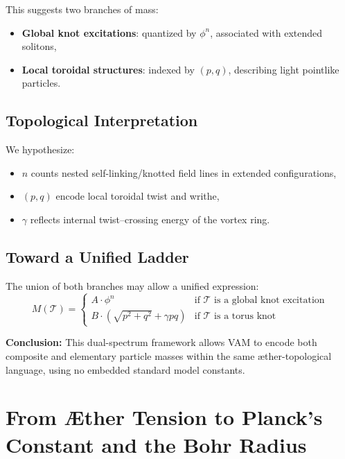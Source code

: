 \documentclass[a4paper,12pt]{article}
\begin{document}
        This suggests two branches of mass:
        \begin{itemize}
          \item \textbf{Global knot excitations}: quantized by $\phi^n$, associated with extended solitons,
          \item \textbf{Local toroidal structures}: indexed by $(p,q)$, describing light pointlike particles.
        \end{itemize}

        \subsection{Topological Interpretation}

        We hypothesize:
        \begin{itemize}
          \item $n$ counts nested self-linking/knotted field lines in extended configurations,
          \item $(p,q)$ encode local toroidal twist and writhe,
          \item $\gamma$ reflects internal twist–crossing energy of the vortex ring.
        \end{itemize}

        \subsection{Toward a Unified Ladder}

        The union of both branches may allow a unified expression:
        \[
        M(\mathcal{T}) =
        \begin{cases}
        A \cdot \phi^n & \text{if } \mathcal{T} \text{ is a global knot excitation} \\
        B \cdot \left( \sqrt{p^2 + q^2} + \gamma pq \right) & \text{if } \mathcal{T} \text{ is a torus knot}
        \end{cases}
        \]

        \textbf{Conclusion:} This dual-spectrum framework allows VAM to encode both composite and elementary particle masses within the same æther-topological language, using no embedded standard model constants.

\section{From \AE ther Tension to Planck's Constant and the Bohr Radius}
\end{document}
